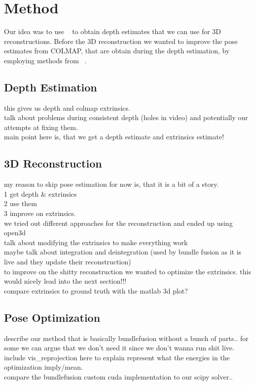 \chapter{Method}
    Our idea was to use ~\cite{luo2020consistent} to obtain depth estimates that we can use for 3D reconstructions.
    Before the 3D reconstruction we wanted to improve the pose estimates from COLMAP, that are obtain during the depth estimation, by employing methods from ~\cite{dai2017bundlefusion}.
    \section{Depth Estimation}
        this gives us depth and colmap extrinsics.\\
        talk about problems during consistent depth (holes in video) and potentially our attempts at fixing them.\\
        main point here is, that we get a depth estimate and extrinsics estimate!
    \section{3D Reconstruction}
        my reason to skip pose estimation for now is, that it is a bit of a story.\\
        1 get depth \& extrinsics\\
        2 use them\\
        3 improve on extrinsics.\\
        we tried out different approaches for the reconstruction and ended up using open3d\\
        talk about modifying the extrinsics to make everything work\\
        maybe talk about integration and deintegration (used by bundle fusion as it is live and they update their reconstruction)\\
        to improve on the shitty reconstruction we wanted to optimize the extrinsics. this would nicely lead into the next section!!!\\
        compare extrinsics to ground truth with the matlab 3d plot?
    \section{Pose Optimization}
        describe our method that is basically bundlefusion without a bunch of parts.. for some we can argue that we don't need it since we don't wanna run shit live.\\
        include vis\_reprojection here to explain represent what the energies in the optimization imply/mean.\\
        compare the bundlefusion custom cuda implementation to our scipy solver..